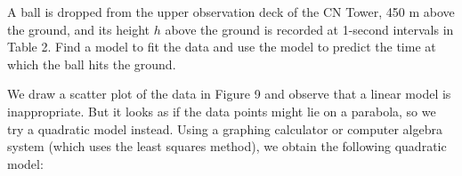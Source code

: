 \documentclass{sebase}
\begin{document}
\begin{Example}[4]
A ball is dropped from the upper observation deck of the CN Tower, 450 m
above the ground, and its height $h$ above the ground is recorded at
1-second \pagebreak \linebreak intervals in Table 2. 
Find a model to fit the data and use the model to predict
the time at which the ball hits the ground.
\end{Example}

\begin{Solution}
We draw a scatter plot of the data in Figure 9 and observe that a linear
model is inappropriate. But it looks as if the data points might lie on a
parabola, so we try a quadratic model instead. Using a graphing calculator
or computer algebra system (which uses the least squares method), we obtain
the following quadratic model:\vspace{-15pt}
\end{Solution}
\end{document}
